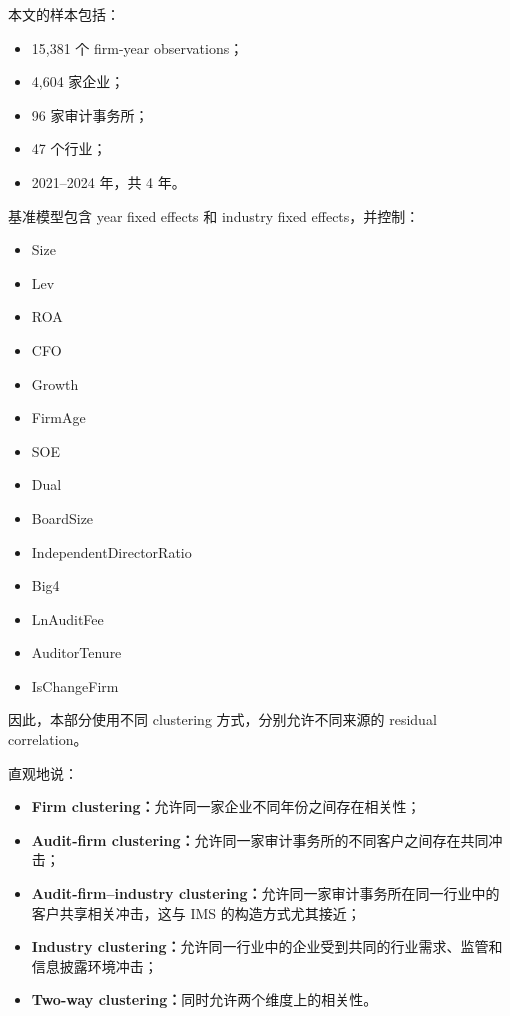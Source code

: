 \documentclass[11pt]{article}
\begin{document}
本文的样本包括：

\begin{itemize}
    \item 15,381 个 firm-year observations；
    \item 4,604 家企业；
    \item 96 家审计事务所；
    \item 47 个行业；
    \item 2021--2024 年，共 4 年。
\end{itemize}

基准模型包含 year fixed effects 和 industry fixed effects，并控制：

\begin{itemize}
    \item Size
    \item Lev
    \item ROA
    \item CFO
    \item Growth
    \item FirmAge
    \item SOE
    \item Dual
    \item BoardSize
    \item IndependentDirectorRatio
    \item Big4
    \item LnAuditFee
    \item AuditorTenure
    \item IsChangeFirm
\end{itemize}

因此，本部分使用不同 clustering 方式，分别允许不同来源的 residual correlation。

直观地说：

\begin{itemize}
    \item \textbf{Firm clustering：}允许同一家企业不同年份之间存在相关性；
    \item \textbf{Audit-firm clustering：}允许同一家审计事务所的不同客户之间存在共同冲击；
    \item \textbf{Audit-firm--industry clustering：}允许同一家审计事务所在同一行业中的客户共享相关冲击，这与 IMS 的构造方式尤其接近；
    \item \textbf{Industry clustering：}允许同一行业中的企业受到共同的行业需求、监管和信息披露环境冲击；
    \item \textbf{Two-way clustering：}同时允许两个维度上的相关性。
\end{itemize}
\end{document}
